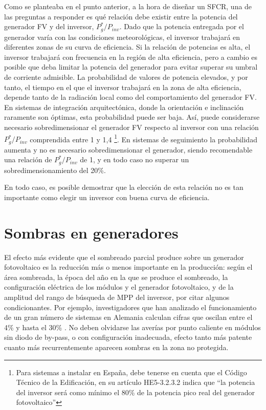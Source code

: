 Como se planteaba en el punto anterior, a la hora de diseñar un SFCR,
una de las preguntas a responder es qué relación debe existir entre
la potencia del generador FV y del inversor, $P_{g}^{*}/P_{inv}$.
Dado que la potencia entregada por el generador varía con las condiciones
meteorológicas, el inversor trabajará en diferentes zonas de su curva
de eficiencia. Si la relación de potencias es alta, el inversor trabajará
con frecuencia en la región de alta eficiencia, pero a cambio es posible
que deba limitar la potencia del generador para evitar superar su
umbral de corriente admisible. La probabilidad de valores de potencia
elevados, y por tanto, el tiempo en el que el inversor trabajará en
la zona de alta eficiencia, depende tanto de la radiación local como
del comportamiento del generador FV. En sistemas de integración arquitectónica,
donde la orientación e inclinación raramente son óptimas, esta probabilidad
puede ser baja. Así, puede considerarse necesario sobredimensionar
el generador FV respecto al inversor con una relación $P_{g}^{*}/P_{inv}$
comprendida entre 1 y 1,4%
\footnote{Para sistemas a instalar en España, debe tenerse en cuenta que el
Código Técnico de la Edificación, en su artículo HE5-3.2.3.2 indica
que {}``la potencia del inversor será como mínimo el 80\% de la potencia
pico real del generador fotovoltaico''%
}. En sistemas de seguimiento la probabilidad aumenta y no es necesario
sobredimensionar el generador, siendo recomendable una relación de
$P_{g}^{*}/P_{inv}$ de 1, y en todo caso no superar un sobredimensionamiento
del 20\%.

En todo caso, es posible demostrar \citep{Lorenzo2005} que la elección
de esta relación no es tan importante como elegir un inversor con
buena curva de eficiencia. 


\section{Sombras en generadores}
\label{sec:sombras}
El efecto más evidente que el sombreado parcial produce sobre un generador
fotovoltaico es la reducción más o menos importante en la producción:
según el área sombreada, la época del año en la que se produce el
sombreado, la configuración eléctrica de los módulos y el generador
fotovoltaico, y de la amplitud del rango de búsqueda de MPP del inversor,
por citar algunos condicionantes. Por ejemplo, investigadores que
han analizado el funcionamiento de un gran número de sistemas en Alemania
calculan cifras que oscilan entre el 4\% y hasta el 30\% \citep{Decker.Jahn1997,Jahn.Nasse2004}.
No deben olvidarse las averías por punto caliente en módulos sin diodo
de by-pass, o con configuración inadecuada, efecto tanto más patente
cuanto más recurrentemente aparecen sombras en la zona no protegida.

